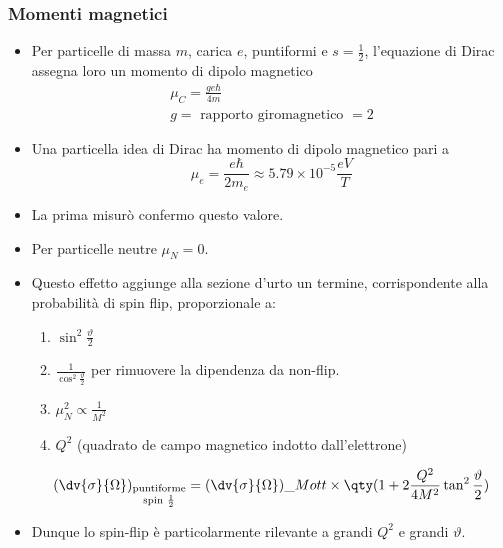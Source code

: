 \subsubsection{Momenti magnetici}
\begin{itemize}
    \item Per particelle di massa $m$, carica $e$, puntiformi e $s=\frac12$, l'equazione di Dirac assegna loro un momento di dipolo magnetico
    \begin{gather*}
    \mu_C=\frac{ge\hbar}{4m}\\
    g=\text{ rapporto giromagnetico }=2
    \end{gather*}
    \item Una particella idea di Dirac ha momento di dipolo magnetico pari a 
    \[
    \mu_e=\frac{e\hbar}{2m_e}\approx 5.79\times10^{-5}\frac{eV}T
    \]
    \item La prima misurò confermo questo valore.
    \item Per particelle neutre $\mu_N=0$.
    \item Questo effetto aggiunge alla sezione d'urto un termine, corrispondente alla probabilità di spin flip, proporzionale a: 
    \begin{enumerate}
    \item $\sin^2\frac\vartheta2$
    \item $\frac1{\cos^2\frac\vartheta2}$ per rimuovere la dipendenza da non-flip.
    \item $\mu_N^2\propto\frac1 {M^2}$
    \item $Q^2$ (quadrato de campo magnetico indotto dall'elettrone)
    \end{enumerate}
    \begin{equation*}
        (\dv{\sigma}{\Omega})_{\begin{subarray}{c}
            \text{puntiforme}\\
            \text{spin }\frac12
         \end{subarray}}=(\dv{\sigma}{\Omega})\_{Mott}\times\qty(1+2\frac{Q^2}{4M^2}\tan^2\frac\vartheta2)
    \end{equation*}
    \item Dunque lo spin-flip è particolarmente rilevante a grandi $Q^2$ e grandi $\vartheta$.
\end{itemize}
